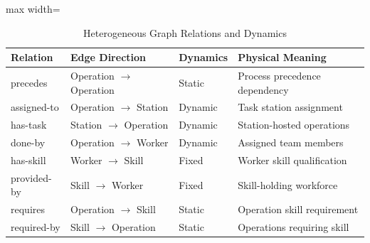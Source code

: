 \documentclass[journal,10pt]{IEEEtran}
\renewcommand{\arraystretch}{1.06}
\begin{document}
\begin{table}[!t]
\centering
\caption{Heterogeneous Graph Relations and Dynamics}
\label{tab:relations}
\setlength{\tabcolsep}{3pt}
\renewcommand{\arraystretch}{1.05}
\begin{adjustbox}{max width=\columnwidth}
\begin{tabular}{@{}llll@{}}
\toprule
\textbf{Relation} & \textbf{Edge Direction} & \textbf{Dynamics} & \textbf{Physical Meaning} \\
\midrule
precedes & Operation $\rightarrow$ Operation & Static & Process precedence dependency \\
assigned-to & Operation $\rightarrow$ Station & Dynamic & Task station assignment \\
has-task & Station $\rightarrow$ Operation & Dynamic & Station-hosted operations \\
done-by & Operation $\rightarrow$ Worker & Dynamic & Assigned team members \\
has-skill & Worker $\rightarrow$ Skill & Fixed & Worker skill qualification \\
provided-by & Skill $\rightarrow$ Worker & Fixed & Skill-holding workforce \\
requires & Operation $\rightarrow$ Skill & Static & Operation skill requirement \\
required-by & Skill $\rightarrow$ Operation & Static & Operations requiring skill \\
\bottomrule
\end{tabular}
\end{adjustbox}
\end{table}
\end{document}
